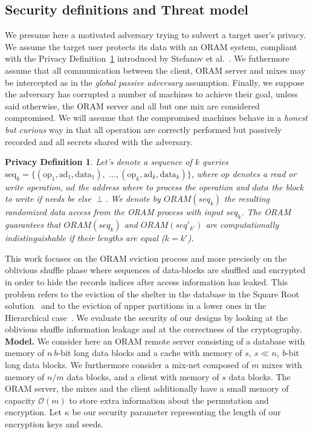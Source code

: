 \documentclass[USenglish,oneside,twocolumn]{article}
\newtheorem{privdef}{Privacy Definition}
\begin{document}
\subsection{Security definitions and Threat model}\label{Threat}

We presume here a motivated adversary trying to subvert a target user's privacy. We assume the target user protects its data with an ORAM system, compliant with the Privacy Definition~\ref{def:Oram} introduced by Stefanov et al.~\cite{stefanov2011towards}.
We futhermore assume that all communication between the client, ORAM server and mixes may be intercepted as in the \textit{global passive adversary} assumption.
Finally, we suppose the adversary has corrupted a number of machines to achieve their goal, unless said otherwise, the ORAM server and all but one mix are considered compromised. We will assume that the compromised machines behave in a \textit{honest but curious} way in that all operation are correctly performed but passively recorded and all secrets shared with the adversary.

\begin{privdef}\label{def:Oram}
Let's denote a sequence of $k$ queries $\text{seq}_k=\{(\text{op}_1, \text{ad}_1, \text{data}_1), \text{ ...},(\text{op}_k, \text{ad}_k, \text{data}_k)\}$, where $op$ denotes a read or write operation, $ad$ the address where to process the operation and $data$ the block to write if needs be else $\perp$.
We denote by $ORAM(seq_k)$ the resulting randomized data access from the ORAM process with input $seq_k$.
The ORAM guarantees that $ORAM(seq_k)$ and $ORAM(seq'_{k'})$ are computationally indistinguishable if their lengths are equal ($k=k'$).
\end{privdef}

This work focuses on the ORAM eviction process and more precisely on the oblivious shuffle phase where sequences of data-blocks are shuffled and encrypted in order to hide the records indices after access information has leaked. This problem refers to the eviction of the shelter in the database in the Square Root solution~\cite{ostrovsky1990efficient} and to the eviction of upper partitions in a lower ones in the Hierarchical case~\cite{goldreich1996software}. We evaluate the security of our designs by looking at the oblivious shuffle information leakage and at the correctness of the cryptography.\\

\noindent\textbf{Model.} We consider here an ORAM remote server consisting of a database with memory of $n\ b$-bit long data blocks and a cache with memory of $s,\ s\ll n,\ b$-bit long data blocks. We furthermore consider a mix-net composed of $m$ mixes with memory of $n/m$ data blocks, and a client with memory of $s$ data blocks. The ORAM server, the mixes and the client additionally have a small memory of capacity $\mathcal{O}(m)$ to store extra information about the  permutation and encryption. Let $\kappa$ be our security parameter representing the length of our encryption keys and seeds.\\
\end{document}
